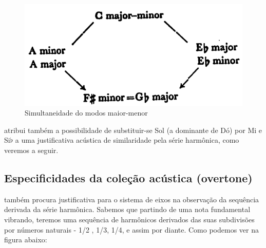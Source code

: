 \documentclass[
	12pt,				%
	openright,			%
	twoside,			%
	a4paper,			%
	english,			%
	french,				%
	spanish,			%
	brazil				%
	]{abntex2}
\begin{document}
\begin{figure}[!h]
	\caption{\label{fig_grafico}Simultaneidade do modos maior-menor }
	\begin{center}
	    \includegraphics[scale=0.3]{axis/maiormenor.png}
	\end{center}
\end{figure}

 atribui também a possibilidade de substituir-se Sol (a dominante de Dó) por Mi e Si$\flat$ a uma justificativa acústica de similaridade pela série harmônica, como veremos a seguir. 



\subsection{Especificidades da coleção acústica (overtone)}

 também procura  justificativa para o sistema de eixos na observação da sequência derivada da série harmônica. Sabemos que partindo de uma nota fundamental vibrando, teremos uma sequência de harmônicos derivados das suas subdivisões por números naturais - 1/2 , 1/3, 1/4, e assim por diante. Como podemos ver na figura abaixo:
\end{document}
